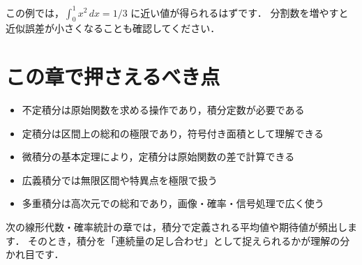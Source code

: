 この例では，$\int_0^1 x^2\,dx = 1/3$ に近い値が得られるはずです．
分割数を増やすと近似誤差が小さくなることも確認してください．


\section{この章で押さえるべき点}

\begin{itemize}
\item 不定積分は原始関数を求める操作であり，積分定数が必要である
\item 定積分は区間上の総和の極限であり，符号付き面積として理解できる
\item 微積分の基本定理により，定積分は原始関数の差で計算できる
\item 広義積分では無限区間や特異点を極限で扱う
\item 多重積分は高次元での総和であり，画像・確率・信号処理で広く使う
\end{itemize}

次の線形代数・確率統計の章では，積分で定義される平均値や期待値が頻出します．
そのとき，積分を「連続量の足し合わせ」として捉えられるかが理解の分かれ目です．
